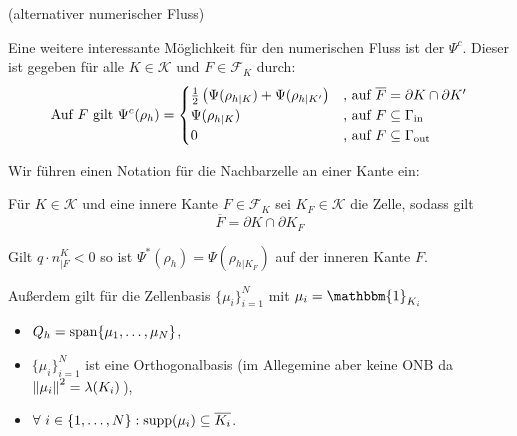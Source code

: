 \begin{remark}(alternativer numerischer Fluss)
	
	Eine weitere interessante Möglichkeit für den numerischen Fluss ist der  $ \Psi^c $. Dieser ist gegeben für alle $ K \in \mathcal{K} $ und $ F \in \mathcal{F}_K $ durch:
	\begin{gather*}
		\text{Auf } F \text{ gilt }\Psi^c(\rho_h) = \begin{cases}
		\frac{1}{2} \left( \Psi(\rho_{h|K}) + \Psi(\rho_{h|K'}  \right) &\text{, auf } \overline{F} = \partial K \cap \partial K'\\
		\Psi(\rho_{h|K}) &\text{, auf } F \subseteq \Gamma_{{\text{in}}}\\
		0 &\text{, auf } F \subseteq \Gamma_{{\text{out}}} 
		\end{cases}
	\end{gather*}
\end{remark}

\begin{remark}
	Wir führen einen Notation für die Nachbarzelle an einer Kante ein:
	
	Für $ K \in \mathcal{K} $ und eine innere Kante $ F \in \mathcal{F}_K $ sei $ K_F \in \mathcal{K}$ die Zelle, sodass gilt \[ \overline{F} = \partial K \cap \partial K_F \]
	
	Gilt  $q\cdot n^K_{|F} < 0$ so ist $ \Psi^*(\rho_h) = \Psi(\rho_{h|K_F}) $ auf der inneren Kante $ F $.
\end{remark}
\bigskip
Außerdem gilt für die Zellenbasis $ \{\mu_i\}_{i=1}^N $ mit $ \mu_i = \mathbbm{1}_{K_i} $ 
\begin{itemize}
	\item $ Q_h = \operatorname{span}\{\mu_1, \dots , \mu_N\} $,
	\item $ \{\mu_i\}_{i=1}^N $ ist eine Orthogonalbasis (im Allegemine aber keine ONB da $ \norm{\mu_i}^2 = \lambda(K_i) $\,),
	\item $ \forall \ i \in \{1, \dots , N\}:  \operatorname{supp}(\mu_i) \subseteq \overline{K_i}$.
\end{itemize}
 
